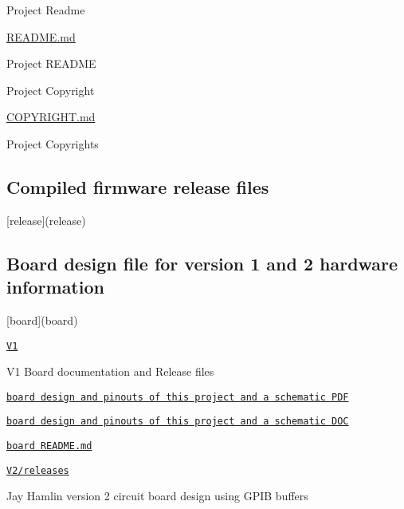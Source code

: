 \begin{DoxyItemize}
\begin{DoxyItemize}
\end{DoxyItemize}
\item Project Readme
\begin{DoxyItemize}
\item \hyperlink{md_README}{R\+E\+A\+D\+ME.md}
\begin{DoxyItemize}
\item Project R\+E\+A\+D\+ME
\end{DoxyItemize}
\end{DoxyItemize}
\item Project Copyright
\begin{DoxyItemize}
\item \hyperlink{COPYRIGHT_8md}{C\+O\+P\+Y\+R\+I\+G\+HT.md}
\begin{DoxyItemize}
\item Project Copyrights
\end{DoxyItemize}
\end{DoxyItemize}
\end{DoxyItemize}

\subsection*{Compiled firmware release files}


\begin{DoxyItemize}
\item \mbox{[}release\mbox{]}(release)
\end{DoxyItemize}

\subsection*{Board design file for version 1 and 2 hardware information}


\begin{DoxyItemize}
\item \mbox{[}board\mbox{]}(board)
\begin{DoxyItemize}
\item \href{board/V1}{\tt V1}
\begin{DoxyItemize}
\item V1 Board documentation and Release files
\item \href{board/V1/HP85Disk.pdf}{\tt board design and pinouts of this project and a schematic P\+DF}
\item \href{board/V1//HP85Disk.doc}{\tt board design and pinouts of this project and a schematic D\+OC}
\item \href{board/V1/HP85Disk.doc}{\tt board R\+E\+A\+D\+M\+E.\+md}
\end{DoxyItemize}
\item \href{V2/releases}{\tt V2/releases}
\begin{DoxyItemize}
\item Jay Hamlin version 2 circuit board design using G\+P\+IB buffers
\end{DoxyItemize}
\end{DoxyItemize}
\end{DoxyItemize}

